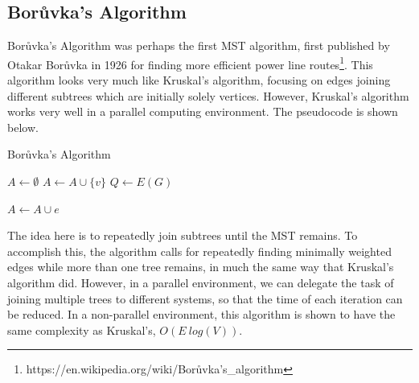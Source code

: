 \subsection{Bor\r{u}vka's Algorithm}
Bor\r{u}vka's Algorithm was perhaps the first MST algorithm, first published by Otakar Bor\r{u}vka in 1926 for finding more efficient power line routes\footnote{https://en.wikipedia.org/wiki/Borůvka's\_algorithm}. This algorithm looks very much like Kruskal's algorithm, focusing on edges joining different subtrees which are initially solely vertices. However, Kruskal's algorithm works very well in a parallel computing environment. The pseudocode is shown below.
\begin{algorithm}
    \DontPrintSemicolon
    \caption{Bor\r{u}vka's Algorithm}


    $A \gets \emptyset$\;
     {
        $A \gets A \cup \{v\}$\;
    }
    $Q \gets E(G)$\;
     {
         {
             {
                \;
                $A \gets A \cup e$\;
            }
        }

    }
\end{algorithm}

The idea here is to repeatedly join subtrees until the MST remains. To accomplish this, the algorithm calls for repeatedly finding minimally weighted edges while more than one tree remains, in much the same way that Kruskal's algorithm did. However, in a parallel environment, we can delegate the task of joining multiple trees to different systems, so that the time of each iteration can be reduced. In a non-parallel environment, this algorithm is shown to have the same complexity as Kruskal's, $O(E~log(V))$.